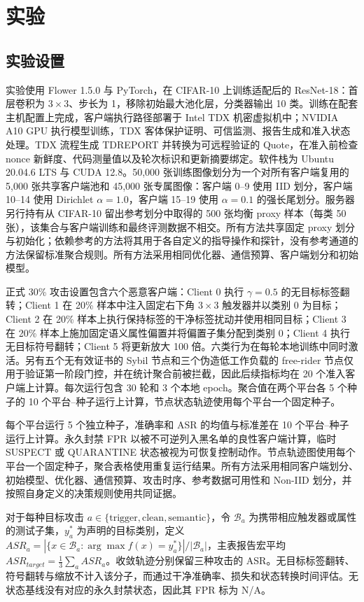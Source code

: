 \documentclass[10pt,a4paper,UTF8,fontset=fandol]{ctexart}
\begin{document}
\section{实验}

\subsection{实验设置}

实验使用 Flower 1.5.0 与 PyTorch，在 CIFAR-10 上训练适配后的 ResNet-18：首层卷积为 $3\times3$、步长为 1，移除初始最大池化层，分类器输出 10 类。训练在配套主机配置上完成，客户端执行路径部署于 Intel TDX 机密虚拟机中；NVIDIA A10 GPU 执行模型训练，TDX 客体保护证明、可信监测、报告生成和准入状态处理。TDX 流程生成 TDREPORT 并转换为可远程验证的 Quote，在准入前检查 nonce 新鲜度、代码测量值以及轮次标识和更新摘要绑定。软件栈为 Ubuntu 20.04.6 LTS 与 CUDA 12.8。50,000 张训练图像划分为一个对所有客户端复用的 5,000 张共享客户端池和 45,000 张专属图像：客户端 0--9 使用 IID 划分，客户端 10--14 使用 Dirichlet $\alpha=1.0$，客户端 15--19 使用 $\alpha=0.1$ 的强长尾划分。服务器另行持有从 CIFAR-10 留出参考划分中取得的 500 张均衡 proxy 样本（每类 50 张），该集合与客户端训练和最终评测数据不相交。所有方法共享固定 proxy 划分与初始化；依赖参考的方法将其用于各自定义的指导操作和探针，没有参考通道的方法保留标准聚合规则。所有方法采用相同优化器、通信预算、客户端划分和初始模型。

正式 30\% 攻击设置包含六个恶意客户端：Client 0 执行 $\gamma=0.5$ 的无目标标签翻转；Client 1 在 20\% 样本中注入固定右下角 $3\times3$ 触发器并以类别 0 为目标；Client 2 在 20\% 样本上执行保持标签的干净标签扰动并使用相同目标；Client 3 在 20\% 样本上施加固定语义属性偏置并将偏置子集分配到类别 0；Client 4 执行无目标符号翻转；Client 5 将更新放大 100 倍。六类行为在每轮本地训练中同时激活。另有五个无有效证书的 Sybil 节点和三个伪造低工作负载的 free-rider 节点仅用于验证第一阶段门控，并在统计聚合前被拦截，因此后续指标均在 20 个准入客户端上计算。每次运行包含 30 轮和 3 个本地 epoch。聚合值在两个平台各 5 个种子的 10 个平台--种子运行上计算，节点状态轨迹使用每个平台一个固定种子。

每个平台运行 5 个独立种子，准确率和 ASR 的均值与标准差在 10 个平台--种子运行上计算。永久封禁 FPR 以被不可逆列入黑名单的良性客户端计算，临时 SUSPECT 或 QUARANTINE 状态被视为可恢复控制动作。节点轨迹图使用每个平台一个固定种子，聚合表格使用重复运行结果。所有方法采用相同客户端划分、初始模型、优化器、通信预算、攻击时序、参考数据可用性和 Non-IID 划分，并按照自身定义的决策规则使用共同证据。

对于每种目标攻击 $a\in\{\mathrm{trigger},\mathrm{clean},\mathrm{semantic}\}$，令 $\mathcal{B}_a$ 为携带相应触发器或属性的测试子集，$y_a^*$ 为声明的目标类别，定义 $ASR_a=|\{x\in\mathcal{B}_a:\arg\max f(x)=y_a^*\}|/|\mathcal{B}_a|$，主表报告宏平均 $ASR_{target}=\frac{1}{3}\sum_a ASR_a$。收敛轨迹分别保留三种攻击的 ASR。无目标标签翻转、符号翻转与缩放不计入该分子，而通过干净准确率、损失和状态转换时间评估。无状态基线没有对应的永久封禁状态，因此其 FPR 标为 N/A。
\end{document}

